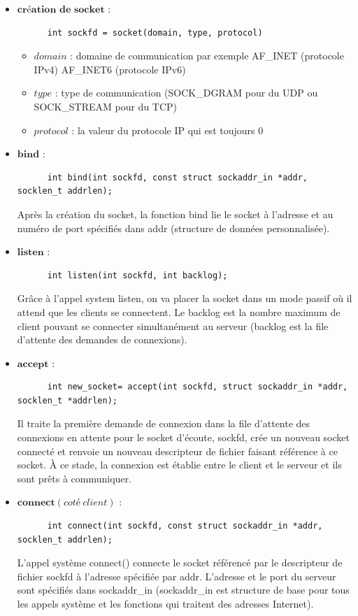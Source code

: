 \documentclass[a4paper,11pt]{report}
\begin{document}
\begin{itemize}
    \item $\textbf{création de socket}$ : 
      \begin{lstlisting} 
      int sockfd = socket(domain, type, protocol)
      \end{lstlisting}
      \begin{itemize}
                  \item $domain$ : domaine de communication par exemple  AF\_INET (protocole IPv4)  AF\_INET6 (protocole IPv6)
                  \item $type$ : type de communication (SOCK\_DGRAM pour du UDP ou SOCK\_STREAM pour du TCP)
                  \item $protocol$ : la valeur du protocole IP qui est toujours 0
      \end{itemize}
    \item $\textbf{bind}$ : 
      \begin{lstlisting} 
      int bind(int sockfd, const struct sockaddr_in *addr, socklen_t addrlen);
      \end{lstlisting}
      Après la création du socket, la fonction bind lie le socket à l'adresse et au numéro de port spécifiés dans addr (structure de données personnalisée).
    \item $\textbf{listen}$ : 
      \begin{lstlisting} 
      int listen(int sockfd, int backlog);
      \end{lstlisting}
      Grâce à l'appel system listen, on va placer la socket dans un mode passif où il attend que les clients se connectent. Le backlog est la nombre maximum de client pouvant se connecter simultanément au serveur (backlog est la file d'attente des demandes de connexions).
    \item $\textbf{accept}$ : 
      \begin{lstlisting} 
      int new_socket= accept(int sockfd, struct sockaddr_in *addr, socklen_t *addrlen);
      \end{lstlisting}
      Il traite la première demande de connexion dans la file d'attente des connexions en attente pour le socket d'écoute, sockfd, crée un nouveau socket connecté et renvoie un nouveau descripteur de fichier faisant référence à ce socket. À ce stade, la connexion est établie entre le client et le serveur et ils sont prêts à communiquer.
      \item $\textbf{connect}(coté~client)$ : 
      \begin{lstlisting} 
      int connect(int sockfd, const struct sockaddr_in *addr, socklen_t addrlen);
      \end{lstlisting}
      L'appel système connect() connecte le socket référencé par le descripteur de fichier sockfd à l'adresse spécifiée par addr. L'adresse et le port du serveur sont spécifiés dans sockaddr\_in (sockaddr\_in est structure de base pour tous les appels système et les fonctions qui traitent des adresses Internet).
\end{itemize}
\end{document}
